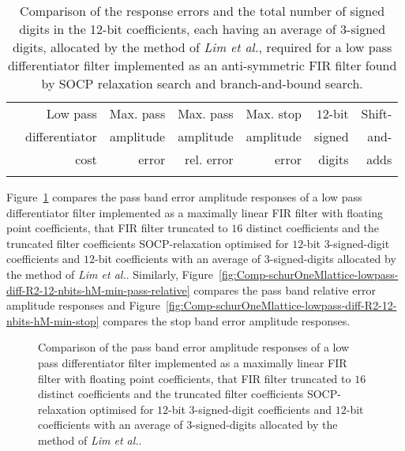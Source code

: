 \documentclass[a4paper,twoside,10pt,english]{article}
\newcommand{\DesignOfSchurLatticeFiltersPdfScale}{1}
\begin{document}
\begin{table}
\centering
\begin{threeparttable}
\begin{tabular}{lrrrrrr} \\ \toprule
 &Low pass        &Max. pass&Max. pass &Max. stop &$12$-bit&Shift-\\
 &differentiator  &amplitude&amplitude &amplitude &signed  &and- \\
 &cost            &error    &rel. error&error     &digits  &adds \\
\midrule

\\ \bottomrule
\end{tabular}
\end{threeparttable}
\caption[Comparison of low pass differentiator filter FIR implementations]
{Comparison of the response errors and the total number of signed digits in the
  12-bit coefficients, each having an average of 3-signed digits, allocated by
  the method of \emph{Lim et al.}, required for a low pass differentiator filter
  implemented as an anti-symmetric FIR filter found by SOCP relaxation search
  and branch-and-bound search.}
\label{tab:Comp-schurOneMlattice-lowpass-diff-R2-12-nbits-hM-min-cost}
\end{table}

Figure~\ref{fig:Comp-schurOneMlattice-lowpass-diff-R2-12-nbits-hM-min-pass}
compares the pass band error amplitude responses of a low pass
differentiator filter implemented as a maximally linear FIR filter with floating
point coefficients, that FIR filter truncated to $16$ distinct coefficients and
the truncated filter coefficients SOCP-relaxation optimised for $12$-bit
$3$-signed-digit coefficients and $12$-bit coefficients with an average of
$3$-signed-digits allocated by the method of \emph{Lim et al.}.
Similarly,
Figure~\ref{fig:Comp-schurOneMlattice-lowpass-diff-R2-12-nbits-hM-min-pass-relative}
compares the pass band relative error amplitude responses and
Figure~\ref{fig:Comp-schurOneMlattice-lowpass-diff-R2-12-nbits-hM-min-stop}
compares the stop band error amplitude responses.

\begin{figure}
\centering
\scalebox{\DesignOfSchurLatticeFiltersPdfScale}{}
\caption{Comparison of the pass band error amplitude responses of a low pass
  differentiator filter implemented as a maximally linear FIR filter with
  floating point coefficients, that FIR filter truncated to $16$ distinct
  coefficients and the truncated filter coefficients SOCP-relaxation optimised
  for $12$-bit $3$-signed-digit coefficients and $12$-bit coefficients with an
  average of $3$-signed-digits allocated by the method of \emph{Lim et al.}.}
\label{fig:Comp-schurOneMlattice-lowpass-diff-R2-12-nbits-hM-min-pass}
\end{figure}
\end{document}

